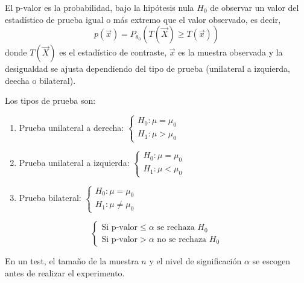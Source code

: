 \begin{definición} [p-valor]
    El p-valor es la probabilidad, bajo la hipótesis nula $H_0$ de observar un valor del estadístico de prueba igual o más extremo que el valor observado, es decir,
    $$p(\vec{x}) = P_{\theta_0}(T(\vec{X}) \geq T(\vec{x}))$$
    donde $T(\vec{X})$ es el estadístico de contraste, $\vec{x}$ es la muestra observada y la desigualdad se ajusta dependiendo del tipo de prueba (unilateral a izquierda, deecha o bilateral).
\end{definición}

\begin{observación}
    Los tipos de prueba son:
    \begin{enumerate}
        \item Prueba unilateral a derecha: $\begin{cases} H_0: \mu = \mu_0 \\ H_1: \mu > \mu_0 \end{cases}$
        \item Prueba unilateral a izquierda: $\begin{cases} H_0: \mu = \mu_0 \\ H_1: \mu < \mu_0 \end{cases}$
        \item Prueba bilateral: $\begin{cases} H_0: \mu = \mu_0 \\ H_1: \mu \neq \mu_0 \end{cases}$
    \end{enumerate}
\end{observación}



\begin{observación}
    $$\begin{cases}
        \text{Si p-valor}  \leq \alpha \text{ se rechaza } H_0 \\
        \text{Si p-valor}  > \alpha \text{ no se rechaza } H_0
    \end{cases}$$
\end{observación}

\begin{observación}
    En un test, el tamaño de la muestra $n$ y el nivel de significación $\alpha$ se escogen antes de realizar el experimento.
\end{observación}

